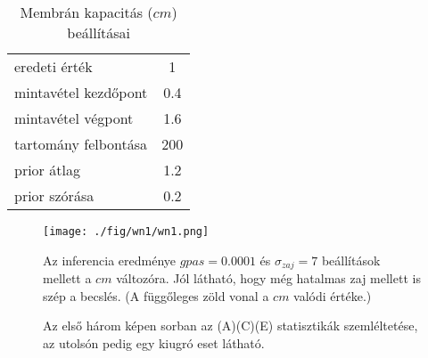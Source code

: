 \begin{table}
	\caption{Membrán kapacitás ($cm$) beállításai}\label{tab:1}
	\centering
			\begin{tabular}{l|c}	
			\\
			eredeti érték& 1 \\
			mintavétel kezdőpont & 0.4 \\
			mintavétel végpont & 1.6 \\
			tartomány felbontása & 200 \\
			prior átlag & 1.2 \\
			prior szórása & 0.2 \\
		   \end{tabular}
\end{table}

\begin{figure}[!htb]
	\centering
	\texttt{[image: ./fig/wn1/wn1.png]}
	\caption[Egy kompartmentum, fehér zaj, egy paraméter eredmény]{Az inferencia eredménye $gpas = 0.0001$ és $\sigma_{zaj} = 7$ beállítások mellett a $cm$ változóra. Jól látható, hogy még hatalmas zaj mellett is szép a becslés. (A függőleges zöld vonal a $cm$ valódi értéke.)}
	\label{fig:wn1}
\end{figure}

\begin{figure}
	\hfill
	\hfill
	\hfill
	\vfill
	\hfill
	\caption[Egykompartmentum, fehér zaj, egy paraméter statisztika]{Az első három képen sorban az (A)(C)(E) statisztikák szemléltetése, az utolsón pedig egy kiugró eset látható.}%
	\label{fig:wn1-stat}
\end{figure}



\FloatBarrier

